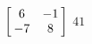{$\left[\hskip -3pt \begin{array}{cc} 6&-1\\  -7&8\end {array} \hskip -3pt
 \right]$} 
{$41$}



  

